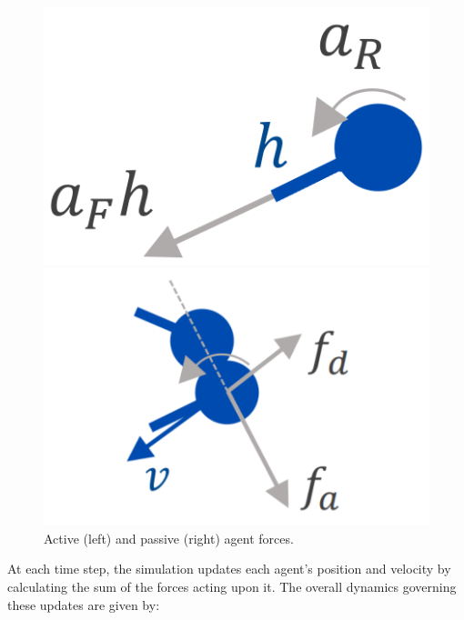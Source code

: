 \documentclass[9pt]{IEEEtran}
\begin{document}
\begin{figure}[hbt]
    \centering
    \begin{minipage}{0.20\textwidth}
        \centering
        \includegraphics[width=\textwidth]{agent_active.png}
    \end{minipage}
    \begin{minipage}{0.25\textwidth}
        \centering
        \includegraphics[width=\textwidth]{agent_passive.png}
    \end{minipage}
    \caption{Active (left) and passive (right) agent forces. \cite{li2023predator}}
    \label{fig:main_figure}
\end{figure}

At each time step, the simulation updates each agent's position and velocity by calculating the sum of the forces acting upon it. The overall dynamics governing these updates are given by:
\end{document}
